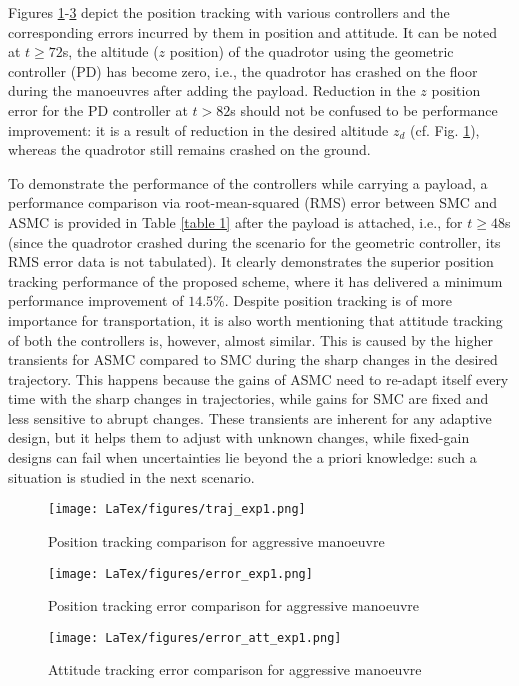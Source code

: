 Figures \ref{fig:traj_exp1}-\ref{fig:error_att_exp1} depict the position tracking with various controllers and the corresponding errors incurred by them in position and attitude. It can be noted at $t\geq 72$s, the altitude ($z$ position) of the quadrotor using the geometric controller (PD) has become zero, i.e., the quadrotor has crashed on the floor during the manoeuvres after adding the payload. Reduction in the $z$ position error for the PD controller at $t>82$s should not be confused to be performance improvement: it is a result of reduction in the desired altitude $z_d$ (cf. Fig. \ref{fig:traj_exp1}), whereas the quadrotor still remains crashed on the ground. 

To demonstrate the performance of the controllers while carrying a payload, a performance comparison via root-mean-squared (RMS) error between SMC and ASMC is provided in Table \ref{table 1} after the payload is attached, i.e., for $t \geq 48$s (since the quadrotor crashed during the scenario for the geometric controller, its RMS error data is not tabulated). It clearly demonstrates the superior position tracking performance of the proposed scheme, where it has delivered a minimum performance improvement of $14.5 \%$. Despite position tracking is of more importance for transportation, it is also worth mentioning that attitude tracking of both the controllers is, however, almost similar. This is caused by the higher transients for ASMC compared to SMC during the sharp changes in the desired trajectory. This happens because the gains of ASMC need to re-adapt itself every time with the sharp changes in trajectories, while gains for SMC are fixed and less sensitive to abrupt changes. These transients are inherent for any adaptive design, but it helps them to adjust with unknown changes, while fixed-gain designs can fail when uncertainties lie beyond the a priori knowledge: such a situation is studied in the next scenario.  


\begin{figure}[t!]
    \texttt{[image: LaTex/figures/traj\_exp1.png]}
    \centering
    \caption{Position tracking comparison for aggressive manoeuvre}
    \label{fig:traj_exp1}
\end{figure}
\begin{figure}[t!]
    \texttt{[image: LaTex/figures/error\_exp1.png]}
    \centering
    \caption{Position tracking error comparison for aggressive manoeuvre}
    \label{fig:error_exp1}
\end{figure}
\begin{figure}[t!]
    \texttt{[image: LaTex/figures/error\_att\_exp1.png]}
    \centering
    \caption{Attitude tracking error comparison for aggressive manoeuvre}
    \label{fig:error_att_exp1}
\end{figure}

